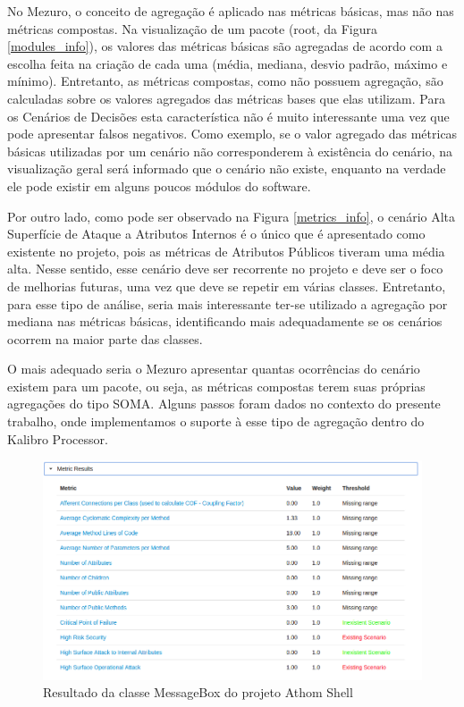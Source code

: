 No Mezuro, o conceito de agregação é aplicado nas métricas básicas, mas não nas métricas compostas. Na visualização de um pacote (root, da Figura \ref{modules_info}), os valores das métricas básicas são agregadas de acordo com a escolha feita na criação de cada uma (média, mediana, desvio padrão, máximo e mínimo). Entretanto, as métricas compostas, como não possuem agregação, são calculadas sobre os valores agregados das métricas bases que elas utilizam. Para os Cenários de Decisões esta característica não é muito interessante uma vez que pode apresentar falsos negativos. Como exemplo, se o valor agregado das métricas básicas utilizadas por um cenário não corresponderem à existência do cenário, na visualização geral será informado que o cenário não existe, enquanto na verdade ele pode existir em alguns poucos módulos do software. 

Por outro lado, como pode ser observado na Figura \ref{metrics_info}, o cenário Alta Superfície de Ataque a Atributos Internos é o único que é apresentado como existente no projeto, pois as métricas de Atributos Públicos tiveram uma média alta. Nesse sentido, esse cenário deve ser recorrente no projeto e deve ser o foco de melhorias futuras, uma vez que deve se repetir em várias classes. Entretanto, para esse tipo de análise, seria mais interessante ter-se utilizado a agregação por mediana nas métricas básicas, identificando mais adequadamente se os cenários ocorrem na maior parte das classes.

O mais adequado seria o Mezuro apresentar quantas ocorrências do cenário existem para um pacote, ou seja, as métricas compostas terem suas próprias agregações do tipo SOMA. Alguns passos foram dados no contexto do presente trabalho, onde implementamos o suporte à esse tipo de agregação dentro do Kalibro Processor. 

\begin{figure}
	\centering
	\includegraphics[scale=0.5]{figuras/message_box_class}
	\caption{Resultado da classe MessageBox do projeto Athom Shell}
	\label{message_box_class}
\end{figure}

